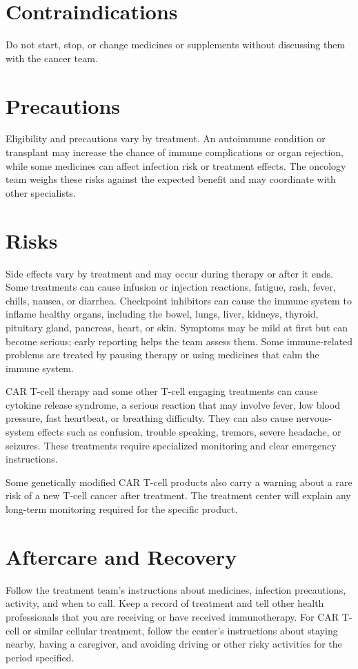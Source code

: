 \section*{Contraindications}
Do not start, stop, or change medicines or supplements without discussing them with the cancer team.

\section*{Precautions}
Eligibility and precautions vary by treatment. An autoimmune condition or transplant may increase the chance of immune complications or organ rejection, while some medicines can affect infection risk or treatment effects. The oncology team weighs these risks against the expected benefit and may coordinate with other specialists.

\section*{Risks}
Side effects vary by treatment and may occur during therapy or after it ends. Some treatments can cause infusion or injection reactions, fatigue, rash, fever, chills, nausea, or diarrhea. Checkpoint inhibitors can cause the immune system to inflame healthy organs, including the bowel, lungs, liver, kidneys, thyroid, pituitary gland, pancreas, heart, or skin. Symptoms may be mild at first but can become serious; early reporting helps the team assess them. Some immune-related problems are treated by pausing therapy or using medicines that calm the immune system.

CAR T-cell therapy and some other T-cell engaging treatments can cause cytokine release syndrome, a serious reaction that may involve fever, low blood pressure, fast heartbeat, or breathing difficulty. They can also cause nervous-system effects such as confusion, trouble speaking, tremors, severe headache, or seizures. These treatments require specialized monitoring and clear emergency instructions.

Some genetically modified CAR T-cell products also carry a warning about a rare risk of a new T-cell cancer after treatment. The treatment center will explain any long-term monitoring required for the specific product.

\section*{Aftercare and Recovery}
Follow the treatment team's instructions about medicines, infection precautions, activity, and when to call. Keep a record of treatment and tell other health professionals that you are receiving or have received immunotherapy. For CAR T-cell or similar cellular treatment, follow the center's instructions about staying nearby, having a caregiver, and avoiding driving or other risky activities for the period specified.

